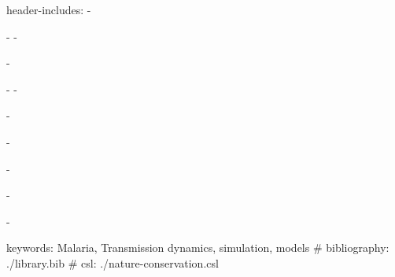 

header-includes:
  - \usepackage{helvet}
  - \renewcommand*\familydefault{\sfdefault}
  - \usepackage{setspace}\doublespacing
  - \usepackage[left]{lineno}
  - \linenumbers
  - \usepackage{dcolumn}
  - \usepackage{caption}
  - \usepackage{float}
  - \usepackage{afterpage}
  - \usepackage{siunitx}
  - \usepackage{amsmath}
keywords: Malaria, Transmission dynamics, simulation, models
# bibliography: ./library.bib
# csl: ./nature-conservation.csl

